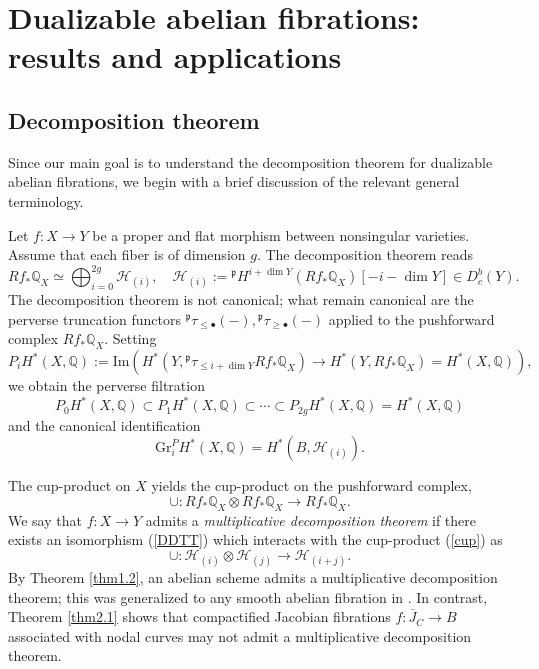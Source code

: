 \documentclass[11pt]{amsart}
\theoremstyle{plain}
\theoremstyle{definition}
\theoremstyle{remark}
\newcommand{\BQ}{{\mathbb{Q}}}
\newcommand{\CH}{{\mathcal H}}
\newcommand{\Fp}{{\mathfrak{p}}}
\begin{document}
\section{Dualizable abelian fibrations: results and applications}\label{sec3}

\subsection{Decomposition theorem}
Since our main goal is to understand the decomposition theorem \cite{BBD} for dualizable abelian fibrations, we begin with a brief discussion of the relevant general terminology.

Let $f: X \to Y$ be a proper and flat morphism between nonsingular varieties. Assume that each fiber is of dimension $g$. The decomposition theorem reads
\begin{equation}\label{DDTT}
Rf_*\BQ_{X} \simeq \bigoplus_{i = 0}^{2g}\CH_{(i)}, \quad \CH_{(i)} := {^\Fp}H^{i + \dim Y}(Rf_{*}\BQ_X)[-i - \dim Y] \in D^b_c(Y).
\end{equation}
The decomposition theorem is not canonical; what remain canonical are the perverse truncation functors ${^\Fp}\tau_{\leq \bullet}(-), {^\Fp}\tau_{\geq \bullet}(-)$ applied to the pushforward complex $Rf_{*}\BQ_X$. Setting
\[
P_iH^*(X, \BQ) := \mathrm{Im}\left(H^*(Y, {^\Fp}\tau_{\leq i + \dim Y}Rf_{*}\BQ_{X}) \to H^*(Y, Rf_{*}\BQ_{X}) = H^*(X, \BQ)\right),
\]
we obtain the perverse filtration
\[
P_0 H^*(X, \BQ) \subset P_1H^*(X, \BQ) \subset \cdots \subset P_{2g}H^*(X, \BQ) = H^*(X, \BQ)
\]
and the canonical identification
\[
\mathrm{Gr}_i^PH^*(X, \BQ) = H^*(B, \CH_{(i)}).
\]

The cup-product on $X$ yields the cup-product on the pushforward complex, 
\begin{equation}\label{cup}
\cup: Rf_* \BQ_X \otimes Rf_* \BQ_X \to Rf_* \BQ_X.
\end{equation}
We say that $f: X\to Y$ admits a \emph{multiplicative decomposition theorem} if there exists an isomorphism (\ref{DDTT}) which interacts with the cup-product (\ref{cup}) as
\[
\cup: \CH_{(i)} \otimes \CH_{(j)} \to \CH_{(i+j)}.
\]
By Theorem \ref{thm1.2}, an abelian scheme admits a multiplicative decomposition theorem; this was generalized to any smooth abelian fibration in \cite[Appendix A]{BMSY2}. In contrast, Theorem \ref{thm2.1} shows that compactified Jacobian fibrations $f: \overline{J}_C \to B$ associated with nodal curves may not admit a multiplicative decomposition theorem. 
\end{document}
